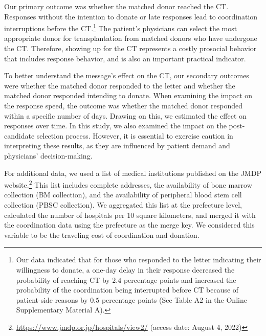 \documentclass[12pt, a4paper]{article}
\begin{document}
Our primary outcome was whether the matched donor reached the CT. Responses without the intention to donate or late responses lead to coordination interruptions before the CT.\footnote{Our data indicated that for those who responded to the letter indicating their willingness to donate, a one-day delay in their response decreased the probability of reaching CT by \(2.4\) percentage points and increased the probability of the coordination being interrupted before CT because of patient-side reasons by \(0.5\) percentage points (See Table A2 in the Online Supplementary Material A).} The patient's physicians can select the most appropriate donor for transplantation from matched donors who have undergone the CT. Therefore, showing up for the CT represents a costly prosocial behavior that includes response behavior, and is also an important practical indicator.

To better understand the message's effect on the CT, our secondary outcomes were whether the matched donor responded to the letter and whether the matched donor responded intending to donate. When examining the impact on the response speed, the outcome was whether the matched donor responded within a specific number of days. Drawing on this, we estimated the effect on responses over time. In this study, we also examined the impact on the post-candidate selection process. However, it is essential to exercise caution in interpreting these results, as they are influenced by patient demand and physicians' decision-making.

For additional data, we used a list of medical institutions published on the JMDP website.\footnote{\url{https://www.jmdp.or.jp/hospitals/view2/} (access date: August 4, 2022)} This list includes complete addresses, the availability of bone marrow collection (BM collection), and the availability of peripheral blood stem cell collection (PBSC collection). We aggregated this list at the prefecture level, calculated the number of hospitals per 10 square kilometers, and merged it with the coordination data using the prefecture as the merge key. We considered this variable to be the traveling cost of coordination and donation.
\end{document}
